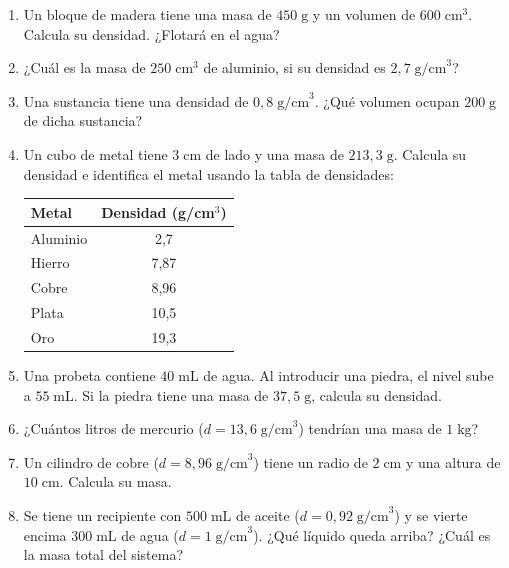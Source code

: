 \documentclass[12pt, a4paper]{article}
\begin{document}
\begin{enumerate}[leftmargin=*, resume]
  \item \facil{} Un bloque de madera tiene una masa de $450\;\text{g}$ y un volumen de $600\;\text{cm}^3$. Calcula su densidad. ¿Flotará en el agua?

  \item \facil{} ¿Cuál es la masa de $250\;\text{cm}^3$ de aluminio, si su densidad es $2{,}7\;\text{g/cm}^3$?

  \item \facil{} Una sustancia tiene una densidad de $0{,}8\;\text{g/cm}^3$. ¿Qué volumen ocupan $200\;\text{g}$ de dicha sustancia?

  \item \facil{} Un cubo de metal tiene $3\;\text{cm}$ de lado y una masa de $213{,}3\;\text{g}$. Calcula su densidad e identifica el metal usando la tabla de densidades:
  \begin{center}
  \small
  \begin{tabular}{lc}
  \toprule
  \textbf{Metal} & \textbf{Densidad (g/cm$^3$)} \\
  \midrule
  Aluminio & 2,7 \\
  Hierro & 7,87 \\
  Cobre & 8,96 \\
  Plata & 10,5 \\
  Oro & 19,3 \\
  \bottomrule
  \end{tabular}
  \end{center}

  \item \medio{} Una probeta contiene $40\;\text{mL}$ de agua. Al introducir una piedra, el nivel sube a $55\;\text{mL}$. Si la piedra tiene una masa de $37{,}5\;\text{g}$, calcula su densidad.

  \item \medio{} ¿Cuántos litros de mercurio ($d = 13{,}6\;\text{g/cm}^3$) tendrían una masa de $1\;\text{kg}$?

  \item \medio{} Un cilindro de cobre ($d = 8{,}96\;\text{g/cm}^3$) tiene un radio de $2\;\text{cm}$ y una altura de $10\;\text{cm}$. Calcula su masa.

  \item \medio{} Se tiene un recipiente con $500\;\text{mL}$ de aceite ($d = 0{,}92\;\text{g/cm}^3$) y se vierte encima $300\;\text{mL}$ de agua ($d = 1\;\text{g/cm}^3$). ¿Qué líquido queda arriba? ¿Cuál es la masa total del sistema?


\end{enumerate}
\end{document}
